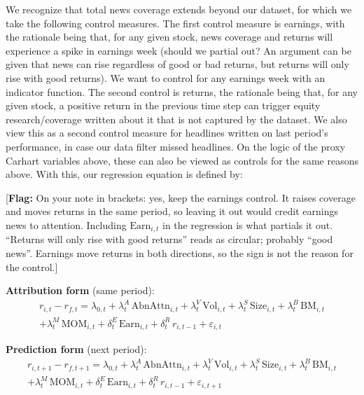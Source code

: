 \documentclass[11pt]{article}
\newcommand{\flag}[1]{{\color{red!75!black}\small [\textbf{Flag:} #1]}}
\begin{document}
We recognize that total news coverage extends beyond our dataset, for which we take the following control measures. The first control measure is earnings, with the rationale being that, for any given stock, news coverage and returns will experience a spike in earnings week (should we partial out? An argument can be given that news can rise regardless of good or bad returns, but returns will only rise with good returns). We want to control for any earnings week with an indicator function. The second control is returns, the rationale being that, for any given stock, a positive return in the previous time step can trigger equity research/coverage written about it that is not captured by the dataset. We also view this as a second control measure for headlines written on last period's performance, in case our data filter missed headlines. On the logic of the proxy Carhart variables above, these can also be viewed as controls for the same reasons above. With this, our regression equation is defined by:

\flag{On your note in brackets: yes, keep the earnings control. It raises coverage and moves returns in the same period, so leaving it out would credit earnings news to attention. Including $\text{Earn}_{i,t}$ in the regression is what partials it out. ``Returns will only rise with good returns'' reads as circular; probably ``good news''. Earnings move returns in both directions, so the sign is not the reason for the control.}

\textbf{Attribution form} (same period):
\begin{multline}
r_{i,t} - r_{f,t} = \lambda_{0,t} + \lambda^{A}_{t}\,\text{AbnAttn}_{i,t} + \lambda^{V}_{t}\,\text{Vol}_{i,t} + \lambda^{S}_{t}\,\text{Size}_{i,t} + \lambda^{B}_{t}\,\text{BM}_{i,t} \\
 + \lambda^{M}_{t}\,\text{MOM}_{i,t} + \delta^{E}_{t}\,\text{Earn}_{i,t} + \delta^{R}_{t}\,r_{i,t-1} + \varepsilon_{i,t}
\end{multline}

\textbf{Prediction form} (next period):
\begin{multline}
r_{i,t+1} - r_{f,t+1} = \lambda_{0,t} + \lambda^{A}_{t}\,\text{AbnAttn}_{i,t} + \lambda^{V}_{t}\,\text{Vol}_{i,t} + \lambda^{S}_{t}\,\text{Size}_{i,t} + \lambda^{B}_{t}\,\text{BM}_{i,t} \\
 + \lambda^{M}_{t}\,\text{MOM}_{i,t} + \delta^{E}_{t}\,\text{Earn}_{i,t} + \delta^{R}_{t}\,r_{i,t-1} + \varepsilon_{i,t+1}
\end{multline}
\end{document}
